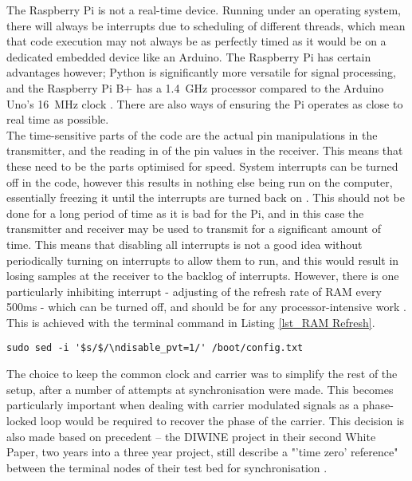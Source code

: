\documentclass[../main.tex]{subfiles}
\begin{document}
The Raspberry Pi is not a real-time device.
Running under an operating system, there will always be interrupts due to scheduling of different threads, which mean that code execution may not always be as perfectly timed as it would be on a dedicated embedded device like an Arduino.
The Raspberry Pi has certain advantages however; Python is significantly more versatile for signal processing, and the Raspberry Pi B+ has a \SI{1.4}{\giga\hertz} processor compared to the Arduino Uno's \SI{16}{\mega\hertz} clock \cite{lib_Arduino}.
There are also ways of ensuring the Pi operates as close to real time as possible.\\

The time-sensitive parts of the code are the actual pin manipulations in the transmitter, and the reading in of the pin values in the receiver.
This means that these need to be the parts optimised for speed.
System interrupts can be turned off in the code, however this results in nothing else being run on the computer, essentially freezing it until the interrupts are turned back on \cite{web_Interrupts}.
This should not be done for a long period of time as it is bad for the Pi, and in this case the transmitter and receiver may be used to transmit for a significant amount of time.
This means that disabling all interrupts is not a good idea without periodically turning on interrupts to allow them to run, and this would result in losing samples at the receiver to the backlog of interrupts.
However, there is one particularly inhibiting interrupt - adjusting of the refresh rate of RAM every 500ms - which can be turned off, and should be for any processor-intensive work \cite{web_PiOscilloscope}.
This is achieved with the terminal command in Listing \ref{lst_RAM Refresh}.\\

\lstset{style=C}
\begin{lstlisting}[caption={Turning off the RAM refresh rate adjustment}, label={lst_RAM Refresh}]
	sudo sed -i '$s/$/\ndisable_pvt=1/' /boot/config.txt
\end{lstlisting}

The choice to keep the common clock and carrier was to simplify the rest of the setup, after a number of attempts at synchronisation were made.
This becomes particularly important when dealing with carrier modulated signals as a phase-locked loop would be required to recover the phase of the carrier.
This decision is also made based on precedent -- the DIWINE project in their second White Paper, two years into a three year project, still describe a "'time zero' reference" between the terminal nodes of their test bed for synchronisation \cite{pap_DIWINEpaper2}.
\end{document}
